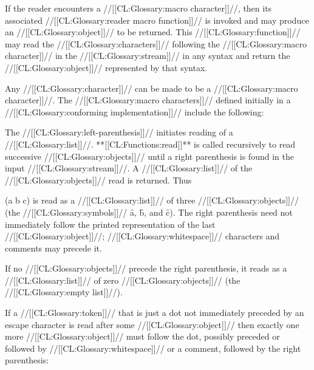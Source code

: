 



If the reader encounters a //[[CL:Glossary:macro character]]//,
then its associated //[[CL:Glossary:reader macro function]]// 
is invoked and may produce an //[[CL:Glossary:object]]// to be returned.
This //[[CL:Glossary:function]]// may read the //[[CL:Glossary:characters]]// 
following the //[[CL:Glossary:macro character]]// in the //[[CL:Glossary:stream]]// 
in any syntax and return the //[[CL:Glossary:object]]// represented by that syntax.


Any //[[CL:Glossary:character]]// can be made to be a //[[CL:Glossary:macro character]]//.
The //[[CL:Glossary:macro characters]]// defined initially in a //[[CL:Glossary:conforming implementation]]//
include
the following:

\idxcode{(}




The //[[CL:Glossary:left-parenthesis]]// initiates reading of a //[[CL:Glossary:list]]//.
**[[CL:Functions:read]]** is called recursively to read successive //[[CL:Glossary:objects]]//
until a right parenthesis is found in the input //[[CL:Glossary:stream]]//.
A //[[CL:Glossary:list]]// of the //[[CL:Glossary:objects]]// read is returned.  Thus

\code
 (a b c)
\endcode
is read as a //[[CL:Glossary:list]]// of three //[[CL:Glossary:objects]]//
(the //[[CL:Glossary:symbols]]// \f{a}, \f{b}, and \f{c}).
The right parenthesis need not immediately follow the printed representation of
the last //[[CL:Glossary:object]]//; //[[CL:Glossary:whitespace]]//                              
characters and comments may precede it.











If no //[[CL:Glossary:objects]]// precede the right parenthesis, 
it reads as a //[[CL:Glossary:list]]// of zero //[[CL:Glossary:objects]]// 
(the //[[CL:Glossary:empty list]]//).


If a //[[CL:Glossary:token]]// that is just a dot
not immediately preceded by an escape character
is read after some //[[CL:Glossary:object]]//
then exactly one more //[[CL:Glossary:object]]// must follow the dot,
possibly preceded or followed by //[[CL:Glossary:whitespace]]// or a comment,
followed by the right parenthesis:

